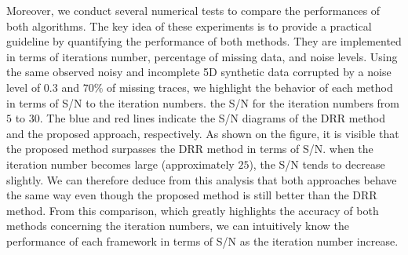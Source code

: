 Moreover, we conduct several numerical tests to compare the performances of both algorithms. The key idea of these experiments is to provide a practical guideline by quantifying the performance of both methods. They are implemented in terms of iterations number,  percentage of missing data, and noise levels. Using the same observed noisy and incomplete 5D synthetic data corrupted by a noise level of $0.3$ and $70\%$ of missing traces, we  highlight the behavior of each method in terms of S/N to the iteration numbers.  the S/N  for the iteration numbers  from $5$ to $30$. The blue and red lines indicate the S/N diagrams of the DRR method and the proposed approach, respectively. As shown on the figure, it is visible that the proposed method surpasses the DRR method in terms of S/N.  when the iteration number becomes large (approximately $25$), the S/N  tends to decrease slightly. We can therefore deduce from this analysis that both approaches behave the same way even though the proposed method is still better than the DRR method. From this comparison, which greatly highlights the accuracy of both methods concerning the iteration numbers, we can intuitively know the performance of each framework in terms of S/N as the iteration number increase. 


